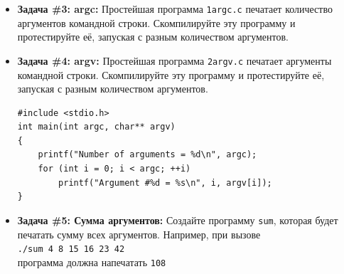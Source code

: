 \documentclass{article}
\begin{document}
\begin{itemize}
\item \textbf{Задача \#3: argc:} Простейшая программа \texttt{1argc.c} печатает количество аргументов командной строки. Скомпилируйте эту программу и протестируйте её, запуская с разным количеством аргументов.
\item \textbf{Задача \#4: argv:} Простейшая программа \texttt{2argv.c} печатает аргументы командной строки. Скомпилируйте эту программу и протестируйте её, запуская с разным количеством аргументов.
\begin{lstlisting}
#include <stdio.h>
int main(int argc, char** argv)
{
	printf("Number of arguments = %d\n", argc);
	for (int i = 0; i < argc; ++i)
		printf("Argument #%d = %s\n", i, argv[i]);
}
\end{lstlisting}
\item \textbf{Задача \#5: Сумма аргументов:} Создайте программу \texttt{sum}, которая будет печатать сумму всех аргументов. Например, при вызове \\
\texttt{./sum 4 8 15 16 23 42}\\
программа должна напечатать \texttt{108}
\end{itemize}

\newpage
\end{document}
